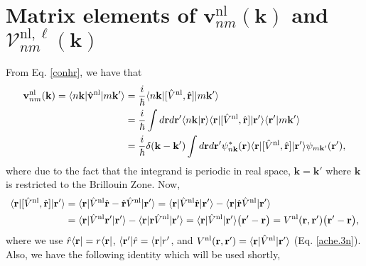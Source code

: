 \documentclass[letterpaper,aps]{revtex4}
\begin{document}
\section{Matrix elements of
\texorpdfstring{$\mathbf{v}^\mathrm{nl}_{nm}(\mathbf{k})$}{vnl} and 
\texorpdfstring{$\boldsymbol{\mathcal{V}}^{\mathrm{nl},\ell}_{nm}(\mathbf{k})$}
{calVnl}}
\label{appvnl}

From Eq. \eqref{conhr}, we have that
\begin{align}\label{vnln.0}
\mathbf{v}^\mathrm{nl}_{nm}(\mathbf{k}) = \langle n\mathbf{k} |\hat{\mathbf{v}}^\mathrm{nl}| m\mathbf{k}' \rangle
&=
\frac{i}{\hbar}
\langle n\mathbf{k} |[\hat{V}^\mathrm{nl},\hat{\mathbf{r}}]| m\mathbf{k}' \rangle
\nonumber\\
&=
\frac{i}{\hbar}
\int d\mathbf{r} d\mathbf{r}'
\langle {n\mathbf{k}} | {\mathbf{r}} \rangle
\langle \mathbf{r} |
[\hat{V}^\mathrm{nl},\hat{\mathbf{r}}]
| \mathbf{r}' \rangle
\langle {\mathbf{r}'} | {m\mathbf{k}'} \rangle
\nonumber\\
&=
\frac{i}{\hbar}
\delta(\mathbf{k}-\mathbf{k}')
\int d\mathbf{r} d\mathbf{r}'
\psi^*_{n\mathbf{k}}(\mathbf{r})
\langle \mathbf{r} |
[\hat{V}^\mathrm{nl},\hat{\mathbf{r}}]
| \mathbf{r}' \rangle
\psi_{m\mathbf{k}'}(\mathbf{r}')
,
\end{align}   
where due to the fact that the integrand is periodic in real space,
$\mathbf{k}=\mathbf{k}'$ where $\mathbf{k}$ is restricted to the Brillouin Zone.
Now,
\begin{align}\label{vnln.1}
\langle \mathbf{r} |
[\hat{V}^\mathrm{nl},\hat{\mathbf{r}}]
| \mathbf{r}' \rangle
&=
\langle \mathbf{r} |
\hat{V}^\mathrm{nl}\hat{\mathbf{r}}
-
\hat{\mathbf{r}}\hat{V}^\mathrm{nl}
| \mathbf{r}' \rangle
=
\langle \mathbf{r} |
\hat{V}^\mathrm{nl}\hat{\mathbf{r}}
| \mathbf{r}' \rangle
-
\langle \mathbf{r} |
\hat{\mathbf{r}}\hat{V}^\mathrm{nl}
| \mathbf{r}' \rangle
\nonumber\\
&=
\langle \mathbf{r} |
\hat{V}^\mathrm{nl} \mathbf{r}'
| \mathbf{r}' \rangle
-
\langle \mathbf{r} |
\mathbf{r}\hat{V}^\mathrm{nl}
| \mathbf{r}' \rangle
=
\langle \mathbf{r} |
\hat{V}^\mathrm{nl}
| \mathbf{r}' \rangle
\big(\mathbf{r}'-\mathbf{r}\big)
=V^\mathrm{nl}(\mathbf{r},\mathbf{r}') \big(\mathbf{r}'-\mathbf{r}\big)
,
\end{align}
where we use 
$\hat r \langle \mathbf{r} |=r \langle \mathbf{r} |$,
$\langle \mathbf{r}' |\hat r=\langle \mathbf{r} |r'$,
and $V^\mathrm{nl}(\mathbf{r},\mathbf{r}')=\langle \mathbf{r} |\hat{V}^\mathrm{nl}| \mathbf{r}' \rangle$ (Eq. \eqref{ache.3n}).
Also, we have the following identity which will be used shortly, 
\end{document}

